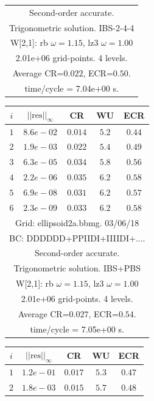 \begin{table}[hbt]
\begin{center}
{\begin{tabular}{|c|c|c|c|c|}
\multicolumn{5}{|c|}{Second-order accurate.}  \\
\multicolumn{5}{|c|}{Trigonometric solution. IBS-2-4-4}  \\
\multicolumn{5}{|c|}{W[2,1]: rb $\omega=1.15$, lz3 $\omega=1.00$}  \\
\multicolumn{5}{|c|}{2.01e+06 grid-points. 4 levels.}  \\
\multicolumn{5}{|c|}{Average CR=$0.022$, ECR=$0.50$.}  \\
\multicolumn{5}{|c|}{time/cycle = 7.04e+00 s.}  \\
\hline 
\end{tabular}
\begin{tabular}{|c|c|c|c|c|} \hline 
 $i$   & $\vert\vert\mbox{res}\vert\vert_\infty$  &  CR     &  WU    & ECR  \\   \hline 
 $ 1$  & $ 8.6e-02$ & $0.014$ & $ 5.2$ & $0.44$ \\ 
 $ 2$  & $ 1.9e-03$ & $0.022$ & $ 5.4$ & $0.49$ \\ 
 $ 3$  & $ 6.3e-05$ & $0.034$ & $ 5.8$ & $0.56$ \\ 
 $ 4$  & $ 2.2e-06$ & $0.035$ & $ 6.2$ & $0.58$ \\ 
 $ 5$  & $ 6.9e-08$ & $0.031$ & $ 6.2$ & $0.57$ \\ 
 $ 6$  & $ 2.3e-09$ & $0.033$ & $ 6.2$ & $0.58$ \\ 
\hline 
\multicolumn{5}{|c|}{Grid: ellipsoid2a.bbmg. 03/06/18}  \\
\multicolumn{5}{|c|}{BC: DDDDDD+PPIIDI+IIIIDI+....}  \\
\multicolumn{5}{|c|}{Second-order accurate.}  \\
\multicolumn{5}{|c|}{Trigonometric solution. IBS+PBS}  \\
\multicolumn{5}{|c|}{W[2,1]: rb $\omega=1.15$, lz3 $\omega=1.00$}  \\
\multicolumn{5}{|c|}{2.01e+06 grid-points. 4 levels.}  \\
\multicolumn{5}{|c|}{Average CR=$0.027$, ECR=$0.54$.}  \\
\multicolumn{5}{|c|}{time/cycle = 7.05e+00 s.}  \\
\hline 
\end{tabular}
\begin{tabular}{|c|c|c|c|c|} \hline 
 $i$   & $\vert\vert\mbox{res}\vert\vert_\infty$  &  CR     &  WU    & ECR  \\   \hline 
 $ 1$  & $ 1.2e-01$ & $0.017$ & $ 5.3$ & $0.47$ \\ 
 $ 2$  & $ 1.8e-03$ & $0.015$ & $ 5.7$ & $0.48$ \\ 

\end{tabular}}
\end{center}
\end{table}
